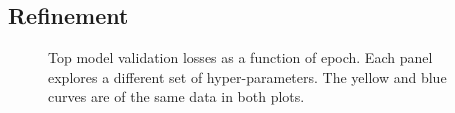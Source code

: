 \documentclass[12pt,journal,compsoc]{IEEEtran}
\begin{document}
\subsection{Refinement}\label{refine}

\begin{figure}[!t]
\normalsize
{}
\caption{Top model validation losses as a function of epoch. Each panel explores a different set of hyper-parameters. The yellow and blue curves are of the same data in both plots.}
\label{fig:top1_pp_pl_sz}
\vspace*{4pt}
\end{figure}



\end{document}
